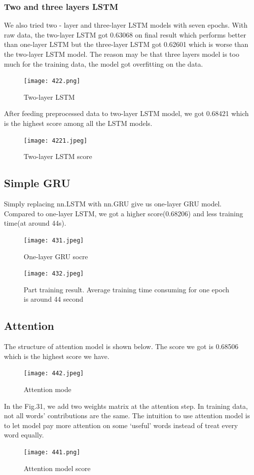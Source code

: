 \documentclass{article}
\begin{document}
\subsubsection{ Two and three layers LSTM}
\noindent We also tried two - layer and three-layer LSTM models with seven epochs. With raw data, the two-layer LSTM got 0.63068 on final result which performs better than one-layer LSTM but the three-layer LSTM got 0.62601 which is worse than the two-layer LSTM model. The reason may be that three layers model is too much for the training data, the model got overfitting on the data.\\
\begin{figure}[H]
	\centering
	\texttt{[image: 422.png]}
	\caption{Two-layer LSTM}
\end{figure}
\noindent After feeding preprocessed data to two-layer LSTM model, we got 0.68421 which is the highest score among all the LSTM models.\\
	\begin{figure}[H]
		\centering
		\texttt{[image: 4221.jpeg]}
		\caption{ Two-layer LSTM score }
	\end{figure}
\subsection{Simple GRU}
\noindent Simply replacing nn.LSTM with nn.GRU give us one-layer GRU model. Compared to one-layer LSTM, we got a higher score(0.68206) and less training time(at around 44s).\\
	\begin{figure}[H]
	\centering
	\texttt{[image: 431.jpeg]}
	\caption{ One-layer GRU socre}
\end{figure}
\begin{figure}[H]
	\centering
	\texttt{[image: 432.jpeg]}
	\caption{Part training result. Average training time consuming for one epoch is around 44 second}
\end{figure}
\subsection{Attention}
\noindent The structure of attention model is shown below. The score we got is 0.68506 which is the highest score we have.\\
\begin{figure}[H]
	\centering
	\texttt{[image: 442.jpeg]}
	\caption{Attention mode}
\end{figure}
\noindent In the Fig.31, we add two weights matrix at the attention step. In training data, not all words’ contributions are the same. The intuition to use attention model is to let model pay more attention on some ‘useful’ words instead of treat every word equally.\\
\begin{figure}[H]
	\centering
	\texttt{[image: 441.png]}
	\caption{Attention model score}
\end{figure}
\end{document}
